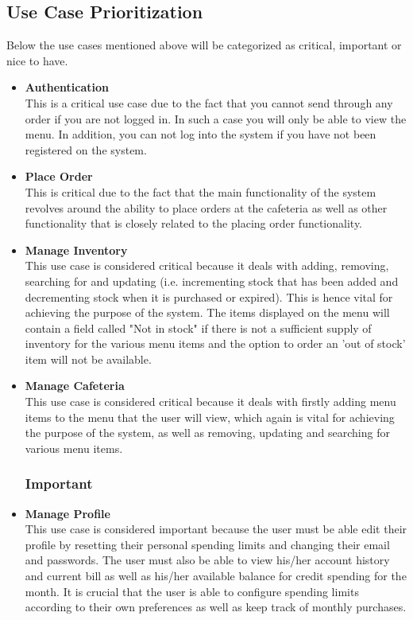 \documentclass[a4paper,12pt]{report}
\begin{document}
\subsection{Use Case Prioritization}
Below the use cases mentioned above will be categorized as critical, important or nice to have.

\begin{itemize}

\subsubsection{Critical}
\item \textbf{Authentication} \\
This is a critical use case due to the fact that you cannot send through any order if you are not logged in. In such a case you will only be able to view the menu. In addition, you can not log into the system if you have not been registered on the system.

\item \textbf{Place Order}\\
This is critical due to the fact that the main functionality of the system revolves around the ability to place orders at the cafeteria as well as other functionality that is closely related to the placing order functionality.

\item \textbf{Manage Inventory} \\
This use case is considered critical because it deals with adding, removing, searching for and updating (i.e. incrementing stock that has been added and decrementing stock when it is purchased or expired). This is hence vital for achieving the purpose of the system. The items displayed on the menu will contain a field called "Not in stock" if there is not a sufficient supply of inventory for the various menu items and the option to order an 'out of stock' item will not be available. 

\item \textbf{Manage Cafeteria} \\
This use case is considered critical because it deals with firstly adding menu items to the menu that the user will view, which again is vital for achieving the purpose of the system, as well as removing, updating and searching for various menu items. 

\subsubsection{Important}
\item \textbf{Manage Profile} \\
This use case is considered important because the user must be able edit their profile by resetting their personal spending limits and changing their email and passwords. The user must also be able to view his/her account history and current bill as well as his/her available balance for credit spending for the month. It is crucial that the user is able to configure spending limits according to their own preferences as well as keep track of monthly purchases.


\end{itemize}
\end{document}
